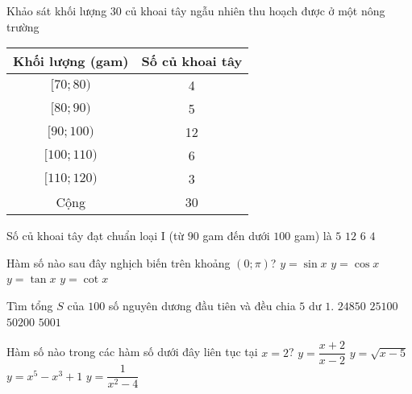 \begin{ex}%
	Khảo sát khối lượng $30$ củ khoai tây ngẫu nhiên thu hoạch được ở một nông trường
	\begin{center}
		\begin{tabular}{|c|c|}
			\hline
			Khối lượng (gam) & Số củ khoai tây \\
			\hline
			$[70{;}80)$      & 4               \\
			$[80{;}90)$      & 5               \\
			$[90{;}100)$     & 12              \\
			$[100{;}110)$    & 6               \\
			$[110{;}120)$    & 3               \\
			\hline
			Cộng             & 30              \\
			\hline
		\end{tabular}
	\end{center}
	Số củ khoai tây đạt chuẩn loại I (từ $90$ gam đến dưới $100$ gam) là
	\choice
	{$5$}
	{\True $12$}
	{$6$}
	{$4$}
\end{ex}

\begin{ex}%
	Hàm số nào sau đây nghịch biến trên khoảng $\left(0;\pi \right)$?
	\choice
	{$y=\sin x$}
	{\True $y=\cos x$}
	{$y=\tan x$}
	{$y=\cot x$}
\end{ex}

\begin{ex}%
	Tìm tổng $S$ của $100$ số nguyên dương đầu tiên và đều chia $5$ dư $1$.
	\choice
	{\True $24850$ }
	{ $25100$ }
	{ $50200$ }
	{ $5001$ }
\end{ex}

\begin{ex}%
	Hàm số nào trong các hàm số dưới đây liên tục tại $x=2$?
	\choice
	{$y=\dfrac{x+2}{x-2}$}
	{$y=\sqrt{x-5}$}
	{\True $y=x^5-x^3+1$}
	{$y=\dfrac{1}{x^2-4}$}
\end{ex}

